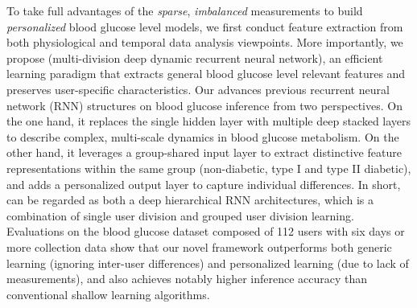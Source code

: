 To take full advantages of the \emph{sparse}, \emph{imbalanced} measurements to build \emph{personalized} blood glucose level models, we first conduct feature extraction from both physiological and temporal data analysis viewpoints. More importantly, we propose \modelname (multi-division deep dynamic recurrent neural network), an efficient learning paradigm that extracts general blood glucose level relevant features and preserves user-specific characteristics.
Our \modelname advances previous recurrent neural network (RNN) structures on blood glucose inference from two perspectives.
On the one hand, it replaces the single hidden layer with multiple deep stacked layers to describe complex, multi-scale dynamics in blood glucose metabolism.
On the other hand, it leverages a group-shared input layer to extract distinctive feature representations within the same group (\ie non-diabetic, type I and type II diabetic), and adds a personalized output layer to capture individual differences.
In short, \modelname can be regarded as both a deep hierarchical RNN architectures, \textcolor[rgb]{1.00,0.00,0.00}{which is a combination of single user division and grouped user division learning}.
Evaluations on the blood glucose dataset composed of 112 users with six days or more collection data show that our novel \modelname framework outperforms both generic learning (\ie ignoring inter-user differences) and personalized learning (due to lack of measurements), and also achieves notably higher inference accuracy than conventional shallow learning algorithms.

